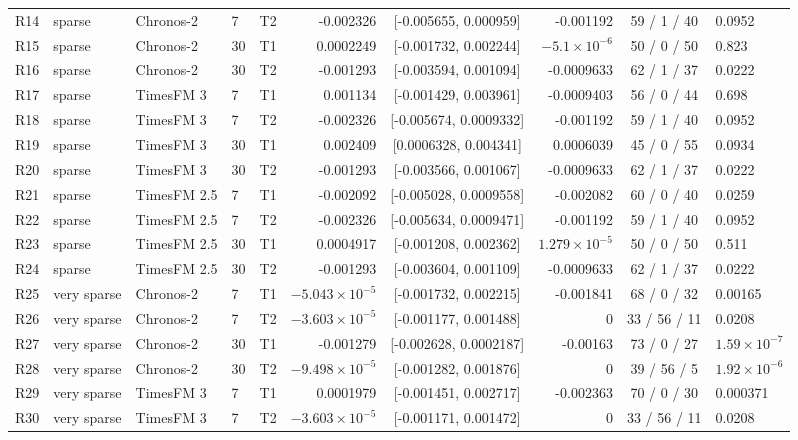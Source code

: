 \begin{table}[htbp]
\begin{tabular}{llllcrcrcl}
R14 & sparse & Chronos-2 & 7 & T2 & -0.002326 & [-0.005655, 0.000959] & -0.001192 & 59 / 1 / 40 & 0.0952 \\
R15 & sparse & Chronos-2 & 30 & T1 & 0.0002249 & [-0.001732, 0.002244] & $-5.1 \times 10^{-6}$ & 50 / 0 / 50 & 0.823 \\
R16 & sparse & Chronos-2 & 30 & T2 & -0.001293 & [-0.003594, 0.001094] & -0.0009633 & 62 / 1 / 37 & 0.0222 \\
R17 & sparse & TimesFM 3 & 7 & T1 & 0.001134 & [-0.001429, 0.003961] & -0.0009403 & 56 / 0 / 44 & 0.698 \\
R18 & sparse & TimesFM 3 & 7 & T2 & -0.002326 & [-0.005674, 0.0009332] & -0.001192 & 59 / 1 / 40 & 0.0952 \\
R19 & sparse & TimesFM 3 & 30 & T1 & 0.002409 & [0.0006328, 0.004341] & 0.0006039 & 45 / 0 / 55 & 0.0934 \\
R20 & sparse & TimesFM 3 & 30 & T2 & -0.001293 & [-0.003566, 0.001067] & -0.0009633 & 62 / 1 / 37 & 0.0222 \\
R21 & sparse & TimesFM 2.5 & 7 & T1 & -0.002092 & [-0.005028, 0.0009558] & -0.002082 & 60 / 0 / 40 & 0.0259 \\
R22 & sparse & TimesFM 2.5 & 7 & T2 & -0.002326 & [-0.005634, 0.0009471] & -0.001192 & 59 / 1 / 40 & 0.0952 \\
R23 & sparse & TimesFM 2.5 & 30 & T1 & 0.0004917 & [-0.001208, 0.002362] & $1.279 \times 10^{-5}$ & 50 / 0 / 50 & 0.511 \\
R24 & sparse & TimesFM 2.5 & 30 & T2 & -0.001293 & [-0.003604, 0.001109] & -0.0009633 & 62 / 1 / 37 & 0.0222 \\
R25 & very sparse & Chronos-2 & 7 & T1 & $-5.043 \times 10^{-5}$ & [-0.001732, 0.002215] & -0.001841 & 68 / 0 / 32 & 0.00165 \\
R26 & very sparse & Chronos-2 & 7 & T2 & $-3.603 \times 10^{-5}$ & [-0.001177, 0.001488] & 0 & 33 / 56 / 11 & 0.0208 \\
R27 & very sparse & Chronos-2 & 30 & T1 & -0.001279 & [-0.002628, 0.0002187] & -0.00163 & 73 / 0 / 27 & $1.59 \times 10^{-7}$ \\
R28 & very sparse & Chronos-2 & 30 & T2 & $-9.498 \times 10^{-5}$ & [-0.001282, 0.001876] & 0 & 39 / 56 / 5 & $1.92 \times 10^{-6}$ \\
R29 & very sparse & TimesFM 3 & 7 & T1 & 0.0001979 & [-0.001451, 0.002717] & -0.002363 & 70 / 0 / 30 & 0.000371 \\
R30 & very sparse & TimesFM 3 & 7 & T2 & $-3.603 \times 10^{-5}$ & [-0.001171, 0.001472] & 0 & 33 / 56 / 11 & 0.0208 \\

\end{tabular}
\end{table}
